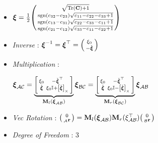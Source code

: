 \documentclass[landscape,a0paper,fontscale=0.285]{baposter} %
\renewenvironment{bmatrix}{\left[\begin{smallmatrix}}{\end{smallmatrix}\right]}
\renewenvironment{pmatrix}{\left(\begin{smallmatrix}}{\end{smallmatrix}\right)}
\begin{document}
\begin{poster}
{\begin{itemize}
\begin{itemize}[label=$\circ$]
        where $\left[\check{\boldsymbol{\xi}}\right]_{\times} = \begin{bmatrix}0 & -\xi_3 & \xi_2 \\ \xi_3 & 0 & -\xi_1 \\ -\xi_2 & \xi_1 & 0\end{bmatrix}$
        \item $\boldsymbol{\xi} = \frac{1}{2}\begin{pmatrix}\sqrt{\text{Tr}(\mathbf{C})+1} \\ \text{sgn}(c_{32}-c_{23})\sqrt{c_{11}-c_{22}-c_{33}+1} \\ \text{sgn}(c_{13}-c_{31})\sqrt{c_{22}-c_{33}-c_{11}+1} \\ \text{sgn}(c_{21}-c_{12})\sqrt{c_{33}-c_{11}-c_{22}+1}\end{pmatrix}$
        \item \textit{Inverse} : $\boldsymbol{\xi}^{-1} = \boldsymbol{\xi}^\top=\begin{pmatrix}\xi_0 \\ -\check{\boldsymbol{\xi}}\end{pmatrix}$
        \item \textit{Multiplication} : 
        
        $\boldsymbol{\xi}_{\mathcal{AC}} = \underbrace{\begin{bmatrix}\xi_0 & -\check{\boldsymbol{\xi}}^\top \\ \check{\boldsymbol{\xi}} & \xi_0\mathbb{I}+\left[\check{\boldsymbol{\xi}}\right]_{\times}\end{bmatrix}}_{\mathbf{M}_l(\boldsymbol{\xi}_{\mathcal{AB}})}\boldsymbol{\xi}_{\mathcal{BC}} = \underbrace{\begin{bmatrix}\xi_0 & -\check{\boldsymbol{\xi}}^\top \\ \check{\boldsymbol{\xi}} & \xi_0\mathbb{I}-\left[\check{\boldsymbol{\xi}}\right]_{\times}\end{bmatrix}}_{\mathbf{M}_r(\boldsymbol{\xi}_{\mathcal{BC}})}\boldsymbol{\xi}_{\mathcal{AB}}$
        \item \textit{Vec Rotation} : $\begin{pmatrix}0 \\ _{\mathcal{A}}\mathbf{r}\end{pmatrix} = \mathbf{M}_l(\boldsymbol{\xi}_{\mathcal{AB}})\mathbf{M}_r(\xi_{\mathcal{AB}}^\top)\begin{pmatrix}0 \\ _{\mathcal{B}}\mathbf{r}\end{pmatrix}$
        \item \textit{Degree of Freedom} : 3
    \end{itemize}


\end{itemize}}
\end{poster}
\end{document}
